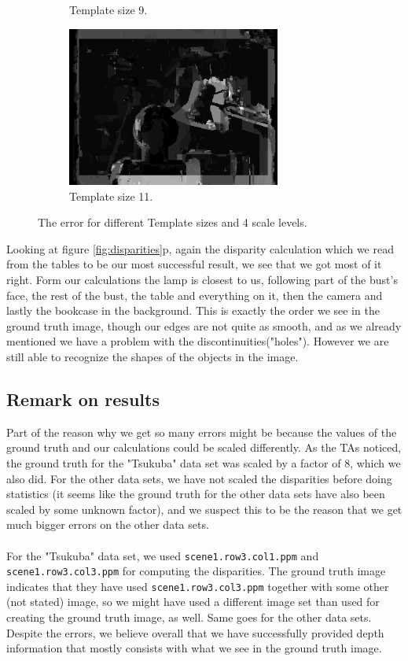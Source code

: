 \documentclass[12pt,a4paper,oneside,final]{article}
\begin{document}
\begin{figure}[H]
\begin{subfigure}[b]{0.5\textwidth}
		\caption{Template size 9.}
	\end{subfigure}%
	\begin{subfigure}[b]{0.5\textwidth}
		\centering
		\includegraphics[width=7cm]{err_s4_k11set_1.png}
		\caption{Template size 11.}
	\end{subfigure}
	\caption{The error for different Template sizes and 4 scale levels.}
	\label{fig:error}
\end{figure}

Looking at figure \ref{fig:disparities}p, again the disparity calculation which we read from the tables to be our most successful result, we see that we got most of it right. Form our calculations the lamp is closest to us, following part of the bust's face, the rest of the bust, the table and everything on it, then the camera and lastly the bookcase in the background. This is exactly the order we see in the ground truth image, though our edges are not quite as smooth, and as we already mentioned we have a problem with the discontinuities("holes"). However we are still able to recognize the shapes of the objects in the image. 

\subsection{Remark on results}
Part of the reason why we get so many errors might be because the values of the ground truth and our calculations could be scaled differently. As the TAs noticed, the ground truth for the "Tsukuba" data set was scaled by a factor of 8, which we also did. For the other data sets, we have not scaled the disparities before doing statistics (it seems like the ground truth for the other data sets have also been scaled by some unknown factor), and we suspect this to be the reason that we get much bigger errors on the other data sets. \\\\ For the "Tsukuba" data set, we used \texttt{scene1.row3.col1.ppm} and \texttt{scene1.row3.col3.ppm} for computing the disparities. The ground truth image indicates that they have used \texttt{scene1.row3.col3.ppm} together with some other (not stated) image, so we might have used a different image set than used for creating the ground truth image, as well. Same goes for the other data sets. Despite the errors, we believe overall that we have successfully provided depth information that mostly consists with what we see in the ground truth image.
	
\end{document}
